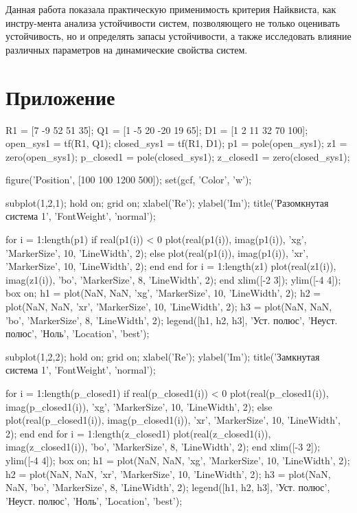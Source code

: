 Данная работа показала практическую применимость критерия Найквиста, как инстру-мента анализа устойчивости систем, позволяющего не только оценивать устойчивость, но и определять запасы устойчивости, а также исследовать влияние различных параметров на динамические свойства систем.

\newpage
\section{Приложение}

\begin{matlabcode}
R1 = [7 -9 52 51 35];
Q1 = [1 -5 20 -20 19 65];
D1 = [1 2 11 32 70 100];   
open_sys1 = tf(R1, Q1);
closed_sys1 = tf(R1, D1);
p1 = pole(open_sys1);
z1 = zero(open_sys1);
p_closed1 = pole(closed_sys1);
z_closed1 = zero(closed_sys1);

figure('Position', [100 100 1200 500]);
set(gcf, 'Color', 'w');

subplot(1,2,1);
hold on;
grid on;
xlabel('Re');
ylabel('Im');
title('Разомкнутая система 1', 'FontWeight', 'normal');

for i = 1:length(p1)
    if real(p1(i)) < 0
        plot(real(p1(i)), imag(p1(i)), 'xg', 'MarkerSize', 10, 'LineWidth', 2);
    else
        plot(real(p1(i)), imag(p1(i)), 'xr', 'MarkerSize', 10, 'LineWidth', 2);
    end
end
for i = 1:length(z1)
    plot(real(z1(i)), imag(z1(i)), 'bo', 'MarkerSize', 8, 'LineWidth', 2);
end
xlim([-2 3]);
ylim([-4 4]);
box on;
h1 = plot(NaN, NaN, 'xg', 'MarkerSize', 10, 'LineWidth', 2);
h2 = plot(NaN, NaN, 'xr', 'MarkerSize', 10, 'LineWidth', 2);
h3 = plot(NaN, NaN, 'bo', 'MarkerSize', 8, 'LineWidth', 2);
legend([h1, h2, h3], {'Уст. полюс', 'Неуст. полюс', 'Ноль'}, 'Location', 'best');

subplot(1,2,2);
hold on;
grid on;
xlabel('Re');
ylabel('Im');
title('Замкнутая система 1', 'FontWeight', 'normal');

for i = 1:length(p_closed1)
    if real(p_closed1(i)) < 0
        plot(real(p_closed1(i)), imag(p_closed1(i)), 'xg', 'MarkerSize', 10, 'LineWidth', 2);
    else
        plot(real(p_closed1(i)), imag(p_closed1(i)), 'xr', 'MarkerSize', 10, 'LineWidth', 2);
    end
end
for i = 1:length(z_closed1)
    plot(real(z_closed1(i)), imag(z_closed1(i)), 'bo', 'MarkerSize', 8, 'LineWidth', 2);
end
xlim([-3 2]);
ylim([-4 4]);
box on;
h1 = plot(NaN, NaN, 'xg', 'MarkerSize', 10, 'LineWidth', 2);
h2 = plot(NaN, NaN, 'xr', 'MarkerSize', 10, 'LineWidth', 2);
h3 = plot(NaN, NaN, 'bo', 'MarkerSize', 8, 'LineWidth', 2);
legend([h1, h2, h3], {'Уст. полюс', 'Неуст. полюс', 'Ноль'}, 'Location', 'best');


\end{matlabcode}
